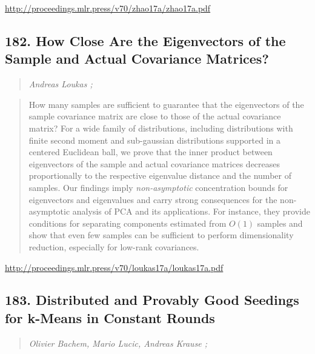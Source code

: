 \documentclass{article}
\begin{document}
\href{http://proceedings.mlr.press/v70/zhao17a/zhao17a.pdf}{http://proceedings.mlr.press/v70/zhao17a/zhao17a.pdf}

\subsection{182. How Close Are the Eigenvectors of the Sample and Actual Covariance Matrices?}

\begin{quote}
\footnotesize{\textit{Andreas Loukas ;}}

\end{quote}

\begin{quote}
    How many samples are sufficient to guarantee that the eigenvectors of the sample covariance matrix are close to those of the actual covariance matrix? For a wide family of distributions, including distributions with finite second moment and sub-gaussian distributions supported in a centered Euclidean ball, we prove that the inner product between eigenvectors of the sample and actual covariance matrices decreases proportionally to the respective eigenvalue distance and the number of samples. Our findings imply \textit{non-asymptotic} concentration bounds for eigenvectors and eigenvalues and carry strong consequences for the non-asymptotic analysis of PCA and its applications. For instance, they provide conditions for separating components estimated from $O(1)$ samples and show that even few samples can be sufficient to perform dimensionality reduction, especially for low-rank covariances.  
\end{quote}

\href{http://proceedings.mlr.press/v70/loukas17a/loukas17a.pdf}{http://proceedings.mlr.press/v70/loukas17a/loukas17a.pdf}

\subsection{183. Distributed and Provably Good Seedings for k-Means in Constant Rounds}

\begin{quote}
\footnotesize{\textit{Olivier Bachem, Mario Lucic, Andreas Krause ;}}

\end{quote}
\end{document}
